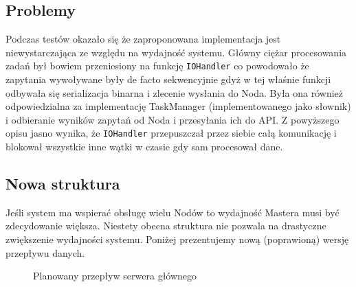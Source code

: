 \documentclass[paper=a4, fontsize=11pt]{scrartcl} %
\numberwithin{equation}{section} %
\numberwithin{figure}{section} %
\numberwithin{table}{section} %
\begin{document}
	\subsection{Problemy}
	
	Podczas testów okazało się że zaproponowana implementacja jest niewystarczająca ze względu na wydajność systemu. Główny ciężar procesowania
	zadań był bowiem przeniesiony na funkcję \texttt{IOHandler} co powodowało że zapytania wywoływane były de facto sekwencyjnie gdyż w tej właśnie
	funkcji odbywała się serializacja binarna i zlecenie wysłania do Noda. Była ona również odpowiedzialna za implementację TaskManager (implementowanego
	jako słownik) i odbieranie wyników zapytań od Noda i przesyłania ich do API. Z powyższego opisu jasno wynika, że \texttt{IOHandler} przepuszczał przez
	siebie całą komunikację i blokował wszystkie inne wątki w czasie gdy sam procesował dane. 
	
	\subsection{Nowa struktura}
	
	Jeśli system ma wspierać obsługę wielu Nodów to wydajność Mastera musi być zdecydowanie większa. Niestety obecna struktura nie pozwala na drastyczne
	zwiększenie wydajności systemu. Poniżej prezentujemy nową (poprawioną) wersję przepływu danych.
	
		\begin{figure}[t]
			\begin{center}
				\caption{Planowany przepływ serwera głównego}
			\end{center}
		\end{figure}
	\clearpage
\end{document}
